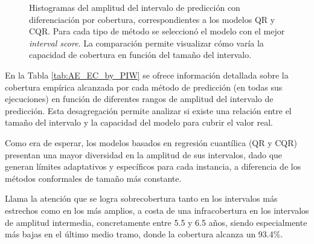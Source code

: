 \begin{figure}[h]
    \caption[
        Histogramas del amplitud del intervalo de predicción con diferenciación por cobertura, correspondientes a los modelos QR y CQR.
    ]{
        Histogramas del amplitud del intervalo de predicción con diferenciación por cobertura, correspondientes a los modelos QR y CQR. 
        Para cada tipo de método se seleccionó el modelo con el mejor \textit{interval score}. La comparación permite visualizar cómo varía la capacidad de cobertura en función del tamaño del intervalo.
    }
    \label{fig:AE_EC_by_PIW}
\end{figure}

En la Tabla \ref{tab:AE_EC_by_PIW} se ofrece información detallada sobre la cobertura empírica alcanzada por cada método de predicción (en todas sus ejecuciones) en función de diferentes rangos de amplitud del intervalo de predicción. Esta desagregación permite analizar si existe una relación entre el tamaño del intervalo y la capacidad del modelo para cubrir el valor real. 

Como era de esperar, los modelos basados en regresión cuantílica (QR y CQR) presentan una mayor diversidad en la amplitud de sus intervalos, dado que generan límites adaptativos y específicos para cada instancia, a diferencia de los métodos conformales de tamaño más constante.

Llama la atención que se logra sobrecobertura tanto en los intervalos más estrechos como en los más amplios, a costa de una infracobertura en los intervalos de amplitud intermedia, concretamente entre 5.5 y 6.5 años, siendo especialmente más bajas en el último medio tramo, donde la cobertura alcanza un 93.4\%.


